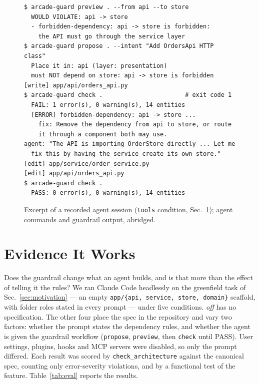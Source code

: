 \documentclass[10pt,conference]{IEEEtran}
\newcommand{\tool}[1]{\texttt{#1}}
\begin{document}
\begin{figure}[t]
\begin{lstlisting}
$ arcade-guard preview . --from api --to store
  WOULD VIOLATE: api -> store
  - forbidden-dependency: api -> store is forbidden:
    the API must go through the service layer
$ arcade-guard propose . --intent "Add OrdersApi HTTP class"
  Place it in: api (layer: presentation)
  must NOT depend on store: api -> store is forbidden
[write] app/api/orders_api.py
$ arcade-guard check .                       # exit code 1
  FAIL: 1 error(s), 0 warning(s), 14 entities
  [ERROR] forbidden-dependency: api -> store ...
    fix: Remove the dependency from api to store, or route
    it through a component both may use.
agent: "The API is importing OrderStore directly ... Let me
  fix this by having the service create its own store."
[edit] app/service/order_service.py
[edit] app/api/orders_api.py
$ arcade-guard check .
  PASS: 0 error(s), 0 warning(s), 14 entities
\end{lstlisting}
  \caption{Excerpt of a recorded agent session (\tool{tools} condition,
  Sec.~\ref{sec:evidence}); agent commands and guardrail output, abridged.}
  \label{fig:transcript}
\end{figure}

\section{Evidence It Works}
\label{sec:evidence}
Does the guardrail change what an agent builds, and is that more than the
effect of telling it the rules? We ran Claude Code headlessly on the greenfield
task of Sec.~\ref{sec:motivation} --- an empty \tool{app/\{api, service, store,
domain\}} scaffold, with folder roles stated in every prompt --- under five
conditions. \emph{off} has no specification. The other four place the spec in
the repository and vary two factors: whether the prompt states the dependency
rules, and whether the agent is given the guardrail workflow (\tool{propose},
\tool{preview}, then \tool{check} until PASS). User settings, plugins, hooks and
MCP servers were disabled, so only the prompt differed. Each result was scored
by \tool{check\_architecture} against the canonical spec, counting only
error-severity violations, and by a functional test of the feature.
Table~\ref{tab:eval} reports the results.
\end{document}
